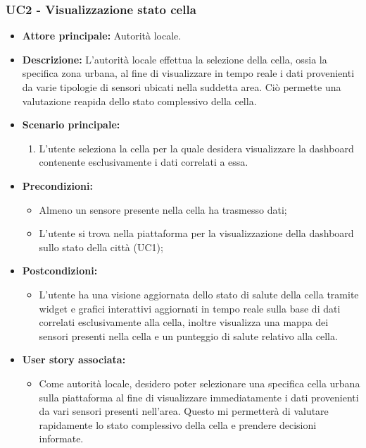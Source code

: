 \subsubsection{UC2 - Visualizzazione stato cella}
\begin{itemize}
    \item \textbf{Attore principale:} Autorità locale.
    \item \textbf{Descrizione:} L'autorità locale effettua la selezione della cella, ossia la specifica zona urbana, al fine di visualizzare in tempo reale i dati provenienti da varie tipologie di sensori ubicati nella suddetta area. Ciò permette una valutazione reapida dello stato complessivo della cella.
    \item \textbf{Scenario principale:}
        \begin{enumerate}
            \item L'utente seleziona la cella per la quale desidera visualizzare la dashboard contenente esclusivamente i dati correlati a essa.
        \end{enumerate}
    \item \textbf{Precondizioni:}
        \begin{itemize}
            \item  Almeno un sensore presente nella cella ha trasmesso dati;
            \item L'utente si trova  nella piattaforma per la visualizzazione della dashboard sullo stato della città (UC1);
        \end{itemize}
    \item \textbf{Postcondizioni:}
        \begin{itemize}
            \item  L'utente ha una visione aggiornata dello stato di salute della cella tramite widget e grafici interattivi aggiornati in tempo reale sulla base di dati correlati esclusivamente alla cella, inoltre visualizza una mappa dei sensori presenti nella cella e un punteggio di salute relativo alla cella.
          \end{itemize}
    \item \textbf{User story associata:}
        \begin{itemize}
            \item Come autorità locale, desidero poter selezionare una specifica cella urbana sulla piattaforma al fine di visualizzare immediatamente i dati provenienti da vari sensori presenti nell'area. Questo mi permetterà di valutare rapidamente lo stato complessivo della cella e prendere decisioni informate.
        \end{itemize}
\end{itemize}